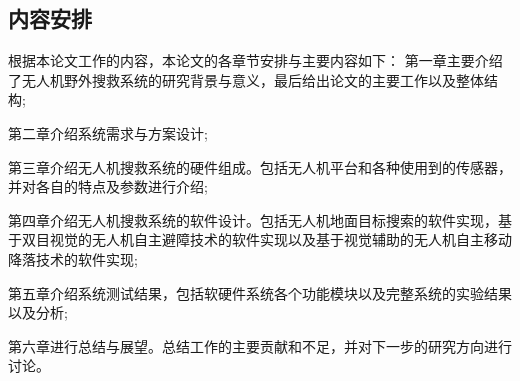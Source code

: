 \subsection{内容安排}
根据本论文工作的内容，本论文的各章节安排与主要内容如下：
第一章主要介绍了无人机野外搜救系统的研究背景与意义，最后给出论文的主要工作以及整体结构;

第二章介绍系统需求与方案设计;

第三章介绍无人机搜救系统的硬件组成。包括无人机平台和各种使用到的传感器，并对各自的特点及参数进行介绍;

第四章介绍无人机搜救系统的软件设计。包括无人机地面目标搜索的软件实现，基于双目视觉的无人机自主避障技术的软件实现以及基于视觉辅助的无人机自主移动降落技术的软件实现;

第五章介绍系统测试结果，包括软硬件系统各个功能模块以及完整系统的实验结果以及分析;

第六章进行总结与展望。总结工作的主要贡献和不足，并对下一步的研究方向进行讨论。



